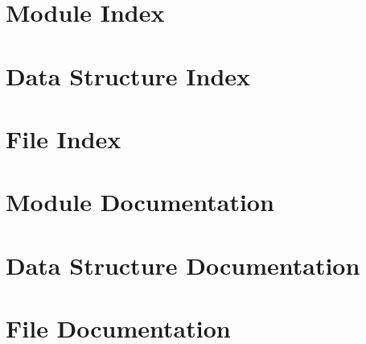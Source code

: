\documentclass[twoside]{book}
\newcommand{\+}{\discretionary{\mbox{\scriptsize$\hookleftarrow$}}{}{}}
\newcommand{\clearemptydoublepage}{%
  \newpage{\pagestyle{empty}\cleardoublepage}%
}
\begin{document}
\chapter{Module Index}

\chapter{Data Structure Index}

\chapter{File Index}

\chapter{Module Documentation}





\chapter{Data Structure Documentation}








\chapter{File Documentation}




\backmatter
\newpage
{}
\clearemptydoublepage
{}
\printindex
\end{document}
